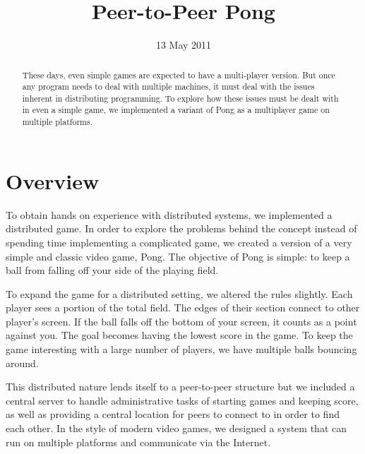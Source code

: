 \documentclass{sig-alternate}
\begin{document}
\title{Peer-to-Peer Pong}
\date{13 May 2011}
\maketitle

\begin{abstract}
	These days, even simple games are expected to have a multi-player
	version.  But once any program needs to deal with multiple machines, it
	must deal with the issues inherent in distributing programming.  To
	explore how these issues must be dealt with in even a simple game, we
	implemented a variant of Pong as a multiplayer game on multiple
	platforms.
\end{abstract}

\section{Overview}
\label{overview}


To obtain hands on experience with distributed systems, we implemented a
distributed game.  In order to explore the problems behind the concept
instead of spending time implementing a complicated game, we created a
version of a very simple and classic video game, Pong.  The objective of
Pong is simple: to keep a ball from falling off your side of the playing
field.

To expand the game for a distributed setting, we altered the rules
slightly.  Each player sees a portion of the total field.  The edges of
their section connect to other player's screen.  If the ball falls off the
bottom of your screen, it counts as a point against you.  The goal becomes
having the lowest score in the game.  To keep the game interesting with a
large number of players, we have multiple balls bouncing around.

This distributed nature lends itself to a peer-to-peer structure but we
included a central server to handle administrative tasks of starting games
and keeping score, as well as providing a central location for peers to
connect to in order to find each other.  In the style of modern video
games, we designed a system that can run on multiple platforms and
communicate via the Internet.
\end{document}
